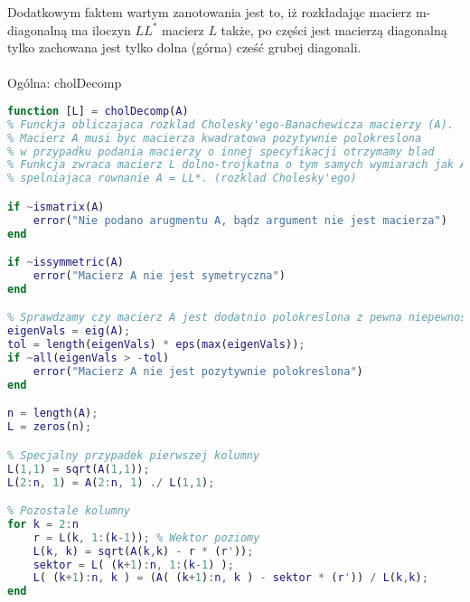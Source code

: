\documentclass[12pt]{article}
\begin{document}
Dodatkowym faktem wartym zanotowania jest to, iż rozkładając macierz m-diagonalną ma iloczyn $LL^*$ macierz $L$ także, po części jest macierzą diagonalną tylko zachowana jest tylko dolna (górna) cześć grubej diagonali.
\\
\\

Ogólna: cholDecomp
\begin{lstlisting}[language=Matlab]
function [L] = cholDecomp(A)
% Funckja obliczajaca rozklad Cholesky'ego-Banachewicza macierzy (A).
% Macierz A musi byc macierza kwadratowa pozytywnie polokreslona
% w przypadku podania macierzy o innej specyfikacji otrzymamy blad
% Funkcja zwraca macierz L dolno-trojkatna o tym samych wymiarach jak A 
% spelniajaca rownanie A = LL*. (rozklad Cholesky'ego)

if ~ismatrix(A)
    error("Nie podano arugmentu A, bądz argument nie jest macierza")
end

if ~issymmetric(A)
    error("Macierz A nie jest symetryczna")
end

% Sprawdzamy czy macierz A jest dodatnio polokreslona z pewna niepewnoscia
eigenVals = eig(A); 
tol = length(eigenVals) * eps(max(eigenVals)); 
if ~all(eigenVals > -tol)
    error("Macierz A nie jest pozytywnie polokreslona")
end

n = length(A);
L = zeros(n);

% Specjalny przypadek pierwszej kolumny
L(1,1) = sqrt(A(1,1));
L(2:n, 1) = A(2:n, 1) ./ L(1,1);

% Pozostale kolumny
for k = 2:n
    r = L(k, 1:(k-1)); % Wektor poziomy
    L(k, k) = sqrt(A(k,k) - r * (r'));
    sektor = L( (k+1):n, 1:(k-1) );
    L( (k+1):n, k ) = (A( (k+1):n, k ) - sektor * (r')) / L(k,k);
end
\end{lstlisting}
\\
\\ 
\\ 
\\ 
\end{document}
